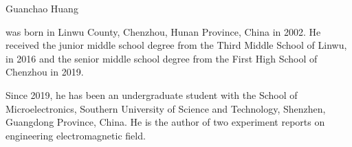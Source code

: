 \documentclass[journal]{IEEEtran}
\begin{document}
\begin{IEEEbiography}{Guanchao Huang}

    was born in Linwu County, Chenzhou, Hunan Province, China in 2002. He received the junior middle school degree from the Third Middle School of Linwu, in 2016 and the senior middle school degree from the First High School of Chenzhou in 2019.

    Since 2019, he has been an undergraduate student with the School of Microelectronics, Southern University of Science and Technology, Shenzhen, Guangdong Province, China. He is the author of two experiment reports on  engineering electromagnetic field.

\end{IEEEbiography}
\end{document}
